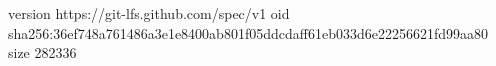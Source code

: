 version https://git-lfs.github.com/spec/v1
oid sha256:36ef748a761486a3e1e8400ab801f05ddcdaff61eb033d6e22256621fd99aa80
size 282336
